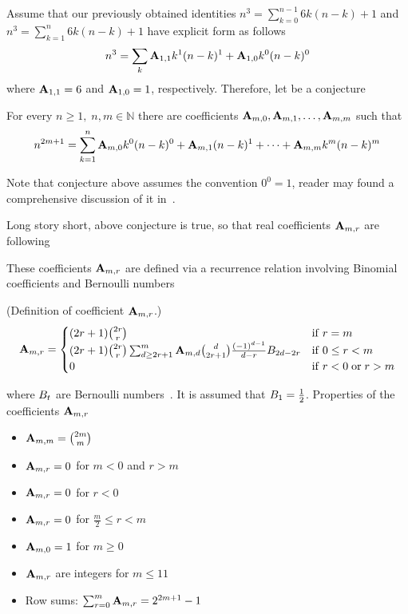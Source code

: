 ﻿Assume that our previously obtained identities
$n^3 = \sum_{k=0}^{n-1} 6k(n-k) + 1$ and $n^3 = \sum_{k=1}^{n} 6k(n-k) + 1$
have explicit form as follows
\begin{align*}
    n^3 = \sum_{k} {\mathbf{A}} \sb{1,1} k^1(n-k)^1 + {\mathbf{A}} \sb{1,0} k^0(n-k)^0
\end{align*}
where ${\mathbf{A}} \sb{1,1} = 6$ and ${\mathbf{A}} \sb{1,0} = 1$, respectively.
Therefore, let be a conjecture
\begin{conjecture}
    \label{conj:generalization}
    For every $n\geq 1, \; n,m\in\mathbb{N}$ there are coefficients ${\mathbf{A}} \sb{m,0}, {\mathbf{A}} \sb{m,1}, \ldots, {\mathbf{A}} \sb{m,m}$ such that
    \begin{align*}
        n^{2m+1} = \sum_{k=1}^{n} {\mathbf{A}} \sb{m,0} k^0 (n-k)^0 + {\mathbf{A}} \sb{m,1} (n-k)^1
        + \cdots + {\mathbf{A}} \sb{m,m} k^m (n-k)^m
    \end{align*}
\end{conjecture}
Note that conjecture above assumes the convention $0^0=1$,
reader may found a comprehensive discussion of it in~\cite{knuth1992two}.

Long story short, above conjecture is true, so that real coefficients ${\mathbf{A}} \sb{m,r}$ are following

These coefficients ${\mathbf{A}} \sb{m,r}$ are defined via a recurrence relation involving Binomial coefficients
and Bernoulli numbers
\begin{definition} (Definition of coefficient ${\mathbf{A}} \sb{m,r}$.)
    \begin{align*}
        \label{eq:definition_coefficient_a}
        {\mathbf{A}} \sb{m,r} =
        \begin{cases}
        (2r+1)
            \binom{2r}{r} & \mathrm{if} \; r=m \\
            (2r+1) \binom{2r}{r} \sum_{d \geq 2r+1}^{m} {\mathbf{A}} \sb{m,d} \binom{d}{2r+1} \frac{(-1)^{d-1}}{d-r}
            {B}\sb{2d-2r} & \mathrm{if} \; 0 \leq r<m \\
            0 & \mathrm{if} \; r<0 \; \mathrm{or} \; r>m
        \end{cases}
    \end{align*}
\end{definition}
where ${B}\sb{t}$ are Bernoulli numbers~\cite{bateman1953higher}.
It is assumed that ${B}\sb{1}=\frac{1}{2}$.
Properties of the coefficients ${\mathbf{A}} \sb{m,r}$
\begin{itemize}
    \item ${\mathbf{A}} \sb{m,m} = \binom{2m}{m}$
    \item ${\mathbf{A}} \sb{m,r} = 0$ for $m < 0$ and $r > m$
    \item ${\mathbf{A}} \sb{m,r} = 0$ for $r < 0$
    \item ${\mathbf{A}} \sb{m,r} = 0$ for $\frac{m}{2} \leq r < m$
    \item ${\mathbf{A}} \sb{m,0} = 1$ for $m \geq 0$
    \item ${\mathbf{A}} \sb{m,r}$ are integers for $m \leq 11$
    \item Row sums: $\sum_{r=0}^{m} {\mathbf{A}} \sb{m,r} = 2^{2m+1} - 1$
\end{itemize}

